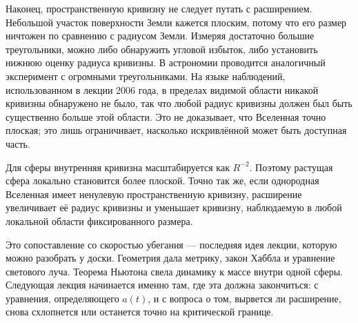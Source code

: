 \begin{classroomqa}
\end{classroomqa}

Наконец, пространственную кривизну не следует путать с расширением. Небольшой участок поверхности Земли кажется плоским, потому что его размер ничтожен по сравнению с радиусом Земли. Измеряя достаточно большие треугольники, можно либо обнаружить угловой избыток, либо установить нижнюю оценку радиуса кривизны. В астрономии проводится аналогичный эксперимент с огромными треугольниками. На языке наблюдений, использованном в лекции 2006 года, в пределах видимой области никакой кривизны обнаружено не было, так что любой радиус кривизны должен был быть существенно больше этой области. Это не доказывает, что Вселенная точно плоская; это лишь ограничивает, насколько искривлённой может быть доступная часть.

Для сферы внутренняя кривизна масштабируется как \(R^{-2}\). Поэтому растущая сфера локально становится более плоской. Точно так же, если однородная Вселенная имеет ненулевую пространственную кривизну, расширение увеличивает её радиус кривизны и уменьшает кривизну, наблюдаемую в любой локальной области фиксированного размера.

\begin{classroomqa}
\end{classroomqa}

Это сопоставление со скоростью убегания — последняя идея лекции, которую можно разобрать у доски. Геометрия дала метрику, закон Хаббла и уравнение светового луча. Теорема Ньютона свела динамику к массе внутри одной сферы. Следующая лекция начинается именно там, где эта должна закончиться: с уравнения, определяющего \(a(t)\), и с вопроса о том, вырвется ли расширение, снова схлопнется или останется точно на критической границе.